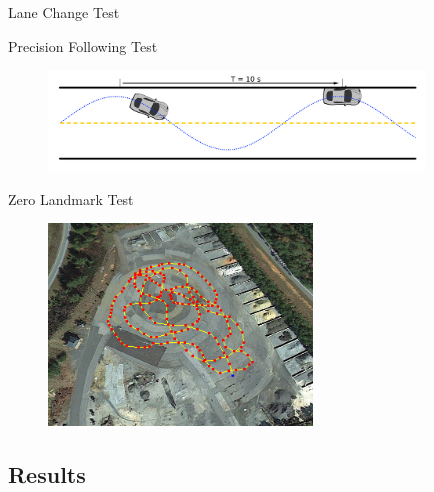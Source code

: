 \documentclass{beamer}
\begin{document}
    \begin{frame}{Lane Change Test}
      \begin{figure}
        
      \end{figure}
    \end{frame}

    \begin{frame}{Precision Following Test}
      \begin{figure}
        \includegraphics[width=10cm]{../graphics/precision_following_diagram.png}
      \end{figure}   
    \end{frame}

    \begin{frame}{Zero Landmark Test}
      \begin{figure}
        \includegraphics[width=7cm]{../graphics/zero_landmark_path.png}
      \end{figure}
    \end{frame}

  \subsection{Results}
\end{document}
